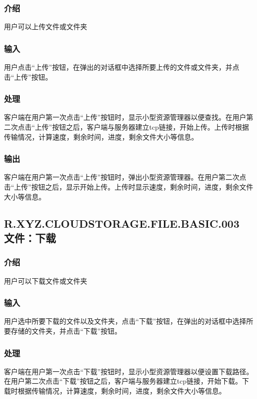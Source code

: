 \subsubsection{介绍}
用户可以上传文件或文件夹

\subsubsection{输入}
用户点击“上传”按钮，在弹出的对话框中选择所要上传的文件或文件夹，并点击“上传”按钮。

\subsubsection{处理}
客户端在用户第一次点击“上传”按钮时，显示小型资源管理器以便查找。在用户第二次点击“上传”按钮之后，客户端与服务器建立tcp链接，开始上传。上传时根据传输情况，计算速度，剩余时间，进度，剩余文件大小等信息。

\subsubsection{输出}
客户端在用户第一次点击“上传”按钮时，弹出小型资源管理器。在用户第二次点击“上传”按钮之后，显示开始上传。上传时显示速度，剩余时间，进度，剩余文件大小等信息。




\subsection{R.XYZ.CLOUDSTORAGE.FILE.BASIC.003 文件：下载}

\subsubsection{介绍}
用户可以下载文件或文件夹

\subsubsection{输入}
用户选中所要下载的文件以及文件夹，点击“下载”按钮，在弹出的对话框中选择所要存储的文件夹，并点击“下载”按钮。

\subsubsection{处理}
客户端在用户第一次点击“下载”按钮时，显示小型资源管理器以便设置下载路径。在用户第二次点击“下载”按钮之后，客户端与服务器建立tcp链接，开始下载。下载时根据传输情况，计算速度，剩余时间，进度，剩余文件大小等信息。

